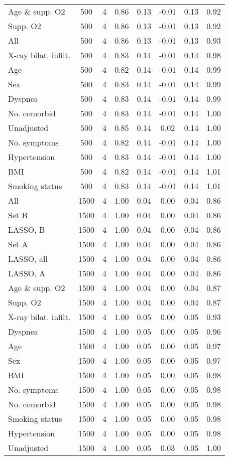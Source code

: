 \documentclass{article}
\begin{document}
\begin{table}[htbp]
{\begin{tabular}{lccccccc}
Age \& supp. O2 & 500 & 4 & 0.86 & 0.13 & -0.01 & 0.13 & 0.92\\
Supp. O2 & 500 & 4 & 0.86 & 0.13 & -0.01 & 0.13 & 0.92\\
All & 500 & 4 & 0.86 & 0.13 & -0.01 & 0.13 & 0.93\\
X-ray bilat. infilt. & 500 & 4 & 0.83 & 0.14 & -0.01 & 0.14 & 0.98\\
Age & 500 & 4 & 0.82 & 0.14 & -0.01 & 0.14 & 0.99\\
Sex & 500 & 4 & 0.83 & 0.14 & -0.01 & 0.14 & 0.99\\
Dyspnea & 500 & 4 & 0.83 & 0.14 & -0.01 & 0.14 & 0.99\\
No. comorbid & 500 & 4 & 0.83 & 0.14 & -0.01 & 0.14 & 1.00\\
Unadjusted & 500 & 4 & 0.85 & 0.14 & 0.02 & 0.14 & 1.00\\
No. symptoms & 500 & 4 & 0.82 & 0.14 & -0.01 & 0.14 & 1.00\\
Hypertension & 500 & 4 & 0.83 & 0.14 & -0.01 & 0.14 & 1.00\\
BMI & 500 & 4 & 0.82 & 0.14 & -0.01 & 0.14 & 1.01\\
Smoking status & 500 & 4 & 0.83 & 0.14 & -0.01 & 0.14 & 1.01\\ \midrule
All & 1500 & 4 & 1.00 & 0.04 & 0.00 & 0.04 & 0.86\\
Set B & 1500 & 4 & 1.00 & 0.04 & 0.00 & 0.04 & 0.86\\
LASSO, B & 1500 & 4 & 1.00 & 0.04 & 0.00 & 0.04 & 0.86\\
Set A & 1500 & 4 & 1.00 & 0.04 & 0.00 & 0.04 & 0.86\\
LASSO, all & 1500 & 4 & 1.00 & 0.04 & 0.00 & 0.04 & 0.86\\
LASSO, A & 1500 & 4 & 1.00 & 0.04 & 0.00 & 0.04 & 0.86\\
Age \& supp. O2 & 1500 & 4 & 1.00 & 0.04 & 0.00 & 0.04 & 0.87\\
Supp. O2 & 1500 & 4 & 1.00 & 0.04 & 0.00 & 0.04 & 0.87\\
X-ray bilat. infilt. & 1500 & 4 & 1.00 & 0.05 & 0.00 & 0.05 & 0.93\\
Dyspnea & 1500 & 4 & 1.00 & 0.05 & 0.00 & 0.05 & 0.96\\
Age & 1500 & 4 & 1.00 & 0.05 & 0.00 & 0.05 & 0.97\\
Sex & 1500 & 4 & 1.00 & 0.05 & 0.00 & 0.05 & 0.97\\
BMI & 1500 & 4 & 1.00 & 0.05 & 0.00 & 0.05 & 0.98\\
No. symptoms & 1500 & 4 & 1.00 & 0.05 & 0.00 & 0.05 & 0.98\\
No. comorbid & 1500 & 4 & 1.00 & 0.05 & 0.00 & 0.05 & 0.98\\
Smoking status & 1500 & 4 & 1.00 & 0.05 & 0.00 & 0.05 & 0.98\\
Hypertension & 1500 & 4 & 1.00 & 0.05 & 0.00 & 0.05 & 0.98\\
Unadjusted & 1500 & 4 & 1.00 & 0.05 & 0.03 & 0.05 & 1.00\\
\bottomrule
\hline
\end{tabular}}
\end{table}
\end{document}
